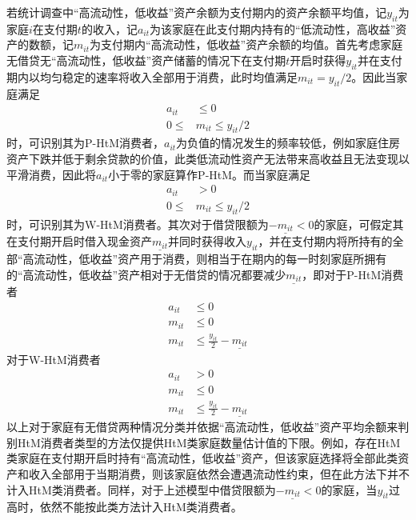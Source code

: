 \documentclass[supercite]{HustGraduPaper}
\begin{document}
    若统计调查中“高流动性，低收益”资产余额为支付期内的资产余额平均值，记$y_{it}$为家庭$i$在支付期$t$的收入，记$a_{it}$为该家庭在此支付期内持有的“低流动性，高收益”资产的数额，记$m_{it}$为支付期内“高流动性，低收益”资产余额的均值。首先考虑家庭无借贷无“高流动性，低收益”资产储蓄的情况下在支付期$t$开启时获得$y_{it}$并在支付期内以均匀稳定的速率将收入全部用于消费，此时均值满足$m_{it}=y_{it}/2$。因此当家庭满足
    \begin{equation}
    \begin{aligned}
    a_{it} & \leq 0\\
    0 \leq & m_{it} \leq y_{it}/2
    \end{aligned}
    \end{equation}
    时，可识别其为P-HtM消费者，$a_{it}$为负值的情况发生的频率较低，例如家庭住房资产下跌并低于剩余贷款的价值，此类低流动性资产无法带来高收益且无法变现以平滑消费，因此将$a_{it}$小于零的家庭算作P-HtM。而当家庭满足
    \begin{equation}
    \begin{aligned}
    a_{it} & > 0\\
    0 \leq & m_{it} \leq y_{it}/2
    \end{aligned}
    \end{equation}
    时，可识别其为W-HtM消费者。其次对于借贷限额为$-\underline{m_{it}}<0$的家庭，可假定其在支付期开启时借入现金资产$\underline{m_{it}}$并同时获得收入$y_{it}$，并在支付期内将所持有的全部“高流动性，低收益”资产用于消费，则相当于在期内的每一时刻家庭所拥有的“高流动性，低收益”资产相对于无借贷的情况都要减少$\underline{m_{it}}$，即对于P-HtM消费者
    \begin{equation}
    \begin{aligned}
    a_{it} & \leq 0\\
    m_{it} & \leq 0\\
    m_{it} & \leq \frac{y_{it}}{2} - \underline{m_{it}}
    \end{aligned}
    \end{equation}
    对于W-HtM消费者
    \begin{equation}
    \begin{aligned}
    a_{it} & > 0\\
    m_{it} & \leq 0\\
    m_{it} & \leq \frac{y_{it}}{2} - \underline{m_{it}}
    \end{aligned}
    \end{equation}
    以上对于家庭有无借贷两种情况分类并依据“高流动性，低收益”资产平均余额来判别HtM消费者类型的方法仅提供HtM类家庭数量估计值的下限。例如，存在HtM类家庭在支付期开启时持有“高流动性，低收益”资产，但该家庭选择将全部此类资产和收入全部用于当期消费，则该家庭依然会遭遇流动性约束，但在此方法下并不计入HtM类消费者。同样，对于上述模型中借贷限额为$-\underline{m_{it}}<0$的家庭，当$y_{it}$过高时，依然不能按此类方法计入HtM类消费者。
\end{document}
